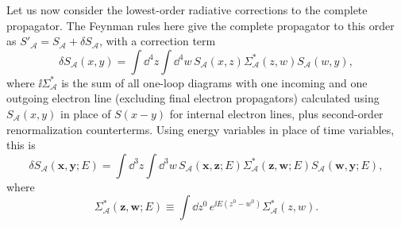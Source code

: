 Let us now consider the lowest-order radiative corrections to the complete
propagator. The Feynman rules here give the complete propagator to this order as
$S'_{\mathcal A}=S_{\mathcal A}+\delta S_{\mathcal A}$, with a correction term
\begin{equation}
 \delta S_{\mathcal A}(x,y)=\int \dd^4z\int \dd^4w\,
 S_{\mathcal A}(x,z)\Sigma^*_{\mathcal A}(z,w)S_{\mathcal A}(w,y),
 \tag{14.2.11}\label{eq:14.2.11}
\end{equation}
where $\ii\Sigma^*_{\mathcal A}$ is the sum of all one-loop diagrams with one
incoming and one outgoing electron line (excluding final electron propagators)
calculated using $S_{\mathcal A}(x,y)$ in place of $S(x-y)$ for internal
electron lines, plus second-order renormalization counterterms. Using energy
variables in place of time variables, this is
\begin{equation}
 \delta S_{\mathcal A}(\mathbf x,\mathbf y;E)=\int \dd^3z\int \dd^3w\,
 S_{\mathcal A}(\mathbf x,\mathbf z;E)\Sigma^*_{\mathcal A}(\mathbf z,\mathbf w;E)
 S_{\mathcal A}(\mathbf w,\mathbf y;E),
 \tag{14.2.12}\label{eq:14.2.12}
\end{equation}
where
\begin{equation}
 \Sigma^*_{\mathcal A}(\mathbf z,\mathbf w;E)
 \equiv\int \dd z^0\,e^{\ii E(z^0-w^0)}\Sigma^*_{\mathcal A}(z,w).
 \tag{14.2.13}\label{eq:14.2.13}
\end{equation}

